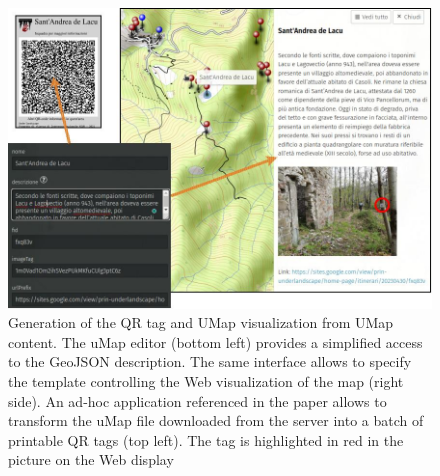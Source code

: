 \documentclass[sustainability,article,submit,pdftex,moreauthors]{Definitions/mdpi}
\begin{document}
\begin{figure}
\includegraphics[width =\linewidth]{figure/combo_gen.jpeg}
\caption{Generation of the QR tag and UMap visualization from UMap content. The uMap editor (bottom left) provides a simplified access to the GeoJSON description. The same interface allows to specify the template controlling the Web visualization of the map (right side). An ad-hoc application referenced in the paper allows to transform the uMap file downloaded from the server into a batch of printable QR tags (top left). The tag is highlighted in red in the picture on the Web display}
\end{figure}
\end{document}
